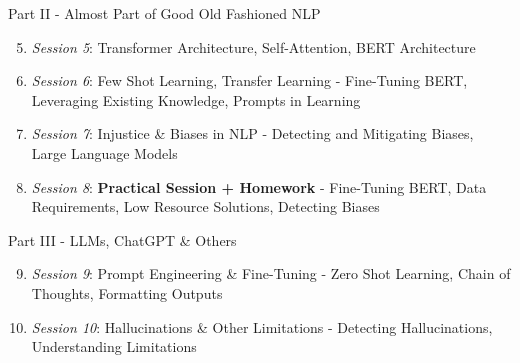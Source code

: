 \documentclass{beamer}
\begin{document}
\begin{frame}{Part II - Almost Part of Good Old Fashioned NLP}

\begin{enumerate}
  \setcounter{enumi}{4}
  \item \textit{Session 5}: Transformer Architecture, Self-Attention, BERT Architecture
  \item \textit{Session 6}: Few Shot Learning, Transfer Learning - Fine-Tuning BERT, Leveraging Existing Knowledge, Prompts in Learning
  \item \textit{Session 7}: Injustice \& Biases in NLP - Detecting and Mitigating Biases, Large Language Models
  \item \textit{Session 8}: \textbf{Practical Session + Homework} - Fine-Tuning BERT, Data Requirements, Low Resource Solutions, Detecting Biases
\end{enumerate}
\end{frame}

\begin{frame}{Part III - LLMs, ChatGPT \& Others}

\begin{enumerate}
  \setcounter{enumi}{8}
  \item \textit{Session 9}: Prompt Engineering \& Fine-Tuning - Zero Shot Learning, Chain of Thoughts, Formatting Outputs
  \item \textit{Session 10}: Hallucinations \& Other Limitations - Detecting Hallucinations, Understanding Limitations
\end{enumerate}
\end{frame}
\end{document}
